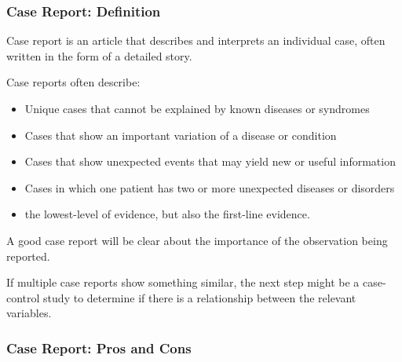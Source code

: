 \documentclass[table,10pt]{beamer}
\begin{document}
\begin{CJK*}{UTF8}{gbsn}
\begin{frame}[t]
\frametitle{Case Report: Definition}
Case report is an article that describes and interprets an individual case, often 
written in the form of a detailed story.

Case reports often describe:
\begin{itemize}
	\item Unique cases that cannot be explained by known diseases or syndromes
	\item Cases that show an important variation of a disease or condition
	\item Cases that show unexpected events that may yield new or useful information
	\item Cases in which one patient has two or more unexpected diseases or disorders
	\item the \alert{lowest-level} of evidence, but also the \alert{first-line} evidence.
\end{itemize}

A good case report will be clear about the importance of the observation being reported.

If multiple case reports show something similar, the next step might be a case-control 
study to determine if there is a relationship between the relevant variables.
\end{frame}


\begin{frame}[t]
\frametitle{Case Report: Pros and Cons}
\end{frame}


\end{CJK*}
\end{document}
